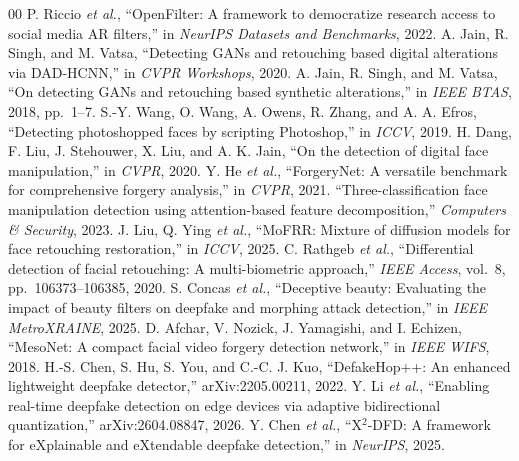 \documentclass[conference]{IEEEtran}
\begin{document}
\begin{thebibliography}{00}
 P. Riccio \emph{et al.}, ``OpenFilter: A framework to democratize research access to social media AR filters,'' in \emph{NeurIPS Datasets and Benchmarks}, 2022.
 A. Jain, R. Singh, and M. Vatsa, ``Detecting GANs and retouching based digital alterations via DAD-HCNN,'' in \emph{CVPR Workshops}, 2020.
 A. Jain, R. Singh, and M. Vatsa, ``On detecting GANs and retouching based synthetic alterations,'' in \emph{IEEE BTAS}, 2018, pp.\ 1--7.
 S.-Y. Wang, O. Wang, A. Owens, R. Zhang, and A. A. Efros, ``Detecting photoshopped faces by scripting Photoshop,'' in \emph{ICCV}, 2019.
 H. Dang, F. Liu, J. Stehouwer, X. Liu, and A. K. Jain, ``On the detection of digital face manipulation,'' in \emph{CVPR}, 2020.
 Y. He \emph{et al.}, ``ForgeryNet: A versatile benchmark for comprehensive forgery analysis,'' in \emph{CVPR}, 2021.
 ``Three-classification face manipulation detection using attention-based feature decomposition,'' \emph{Computers \& Security}, 2023.
 J. Liu, Q. Ying \emph{et al.}, ``MoFRR: Mixture of diffusion models for face retouching restoration,'' in \emph{ICCV}, 2025.
 C. Rathgeb \emph{et al.}, ``Differential detection of facial retouching: A multi-biometric approach,'' \emph{IEEE Access}, vol.\ 8, pp.\ 106373--106385, 2020.
 S. Concas \emph{et al.}, ``Deceptive beauty: Evaluating the impact of beauty filters on deepfake and morphing attack detection,'' in \emph{IEEE MetroXRAINE}, 2025.
 D. Afchar, V. Nozick, J. Yamagishi, and I. Echizen, ``MesoNet: A compact facial video forgery detection network,'' in \emph{IEEE WIFS}, 2018.
 H.-S. Chen, S. Hu, S. You, and C.-C. J. Kuo, ``DefakeHop++: An enhanced lightweight deepfake detector,'' arXiv:2205.00211, 2022.
 Y. Li \emph{et al.}, ``Enabling real-time deepfake detection on edge devices via adaptive bidirectional quantization,'' arXiv:2604.08847, 2026.
 Y. Chen \emph{et al.}, ``X$^2$-DFD: A framework for eXplainable and eXtendable deepfake detection,'' in \emph{NeurIPS}, 2025.
\end{thebibliography}
\end{document}

